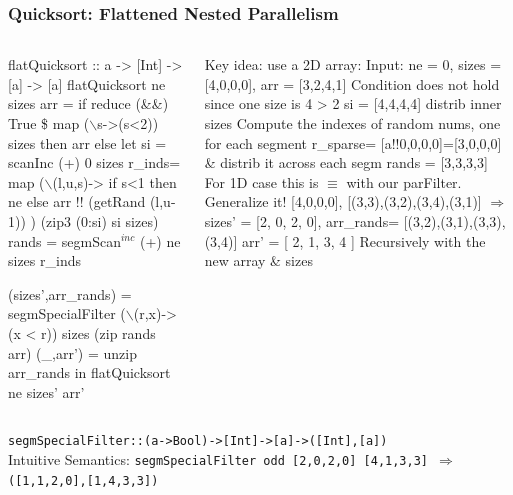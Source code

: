 \documentclass{beamer}
\newcommand{\emp}[1]{\textcolor{DikuRed}{ #1}}
\newcommand{\mymath}[1]{$ #1 $}
\newcommand{\myindu}[1]{^{#1}}
\begin{document}
\begin{frame}[fragile,t]
  \frametitle{Quicksort: Flattened Nested Parallelism}

\begin{columns}
\begin{colorcode}[fontsize=\scriptsize]
flatQuicksort :: a -> [Int] -> [a] -> [a]
flatQuicksort \alert{ne sizes} arr = 
  if reduce (\&\&) True \$ 
         map (\mymath{\backslash}s->(s<2)) sizes 
  then arr else 
  let si = scanInc (+) 0 sizes
      r_inds= 
        map (\mymath{\backslash}(l,u,s)-> 
                if s<1 then ne else 
                     arr !! (getRand (l,u-1))
            )  (zip3 (0:si) si sizes)
      rands = segmScan\mymath{\myindu{inc}} (+) ne sizes r_inds

      (sizes',arr_rands) = segmSpecialFilter 
                  (\mymath{\backslash}(r,x)->(x < r)) 
                  sizes (zip rands arr)
      (_,arr') = unzip arr_rands
  in  flatQuicksort ne sizes' arr'
\end{colorcode}
\pause
\begin{colorcode}[fontsize=\scriptsize]
Key idea: use a 2D array:
Input: ne = 0, sizes = [4,0,0,0], 
               arr   = [3,2,4,1]
Condition does not hold 
since one size is 4 > 2
si = [4,4,4,4] distrib inner sizes
\emp{Compute the indexes of random}
\emp{   nums, one for each segment}
r_sparse= [a!!0,0,0,0]=[3,0,0,0]
\emp{\& distrib it across each segm}
rands   = [3,3,3,3] 
\emp{For 1D case this is \mymath{\equiv}}
\emp{ with our parFilter.} \alert{Generalize it!}
[4,0,0,0], [(3,3),(3,2),(3,4),(3,1)] \mymath{\Rightarrow}
sizes' =   [2,    0,    2,    0], 
arr_rands= [(3,2),(3,1),(3,3),(3,4)]
arr'     = [   2,    1,    3,    4 ]
\emp{Recursively with the new array \& sizes}
\end{colorcode}
\end{columns}
\medskip

{\tt segmSpecialFilter::(a->Bool)->[Int]->[a]->([Int],[a])}\\
\alert{Intuitive Semantics:} 
\alert{\tt segmSpecialFilter odd [2,0,2,0] [4,1,3,3] $\Rightarrow$ ([1,1,2,0],[1,4,3,3])}

\end{frame}

\begin{frame}[fragile]
	\tableofcontents
\end{frame}
\end{document}

